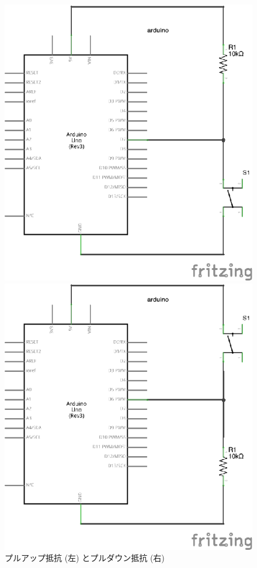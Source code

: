\documentclass[11pt,a4paper]{jarticle}
\begin{document}
\begin{figure}[h!]
 \begin{minipage}{0.5\columnwidth}
  \centering
  \includegraphics[width=0.7\columnwidth]{img/eps/pullup.eps}
 \end{minipage}
 \begin{minipage}{0.5\columnwidth}
  \centering
  \includegraphics[width=0.7\columnwidth]{img/eps/pulldown.eps}
 \end{minipage}
  \caption{プルアップ抵抗 (左) とプルダウン抵抗 (右)}
\end{figure}
\end{document}
